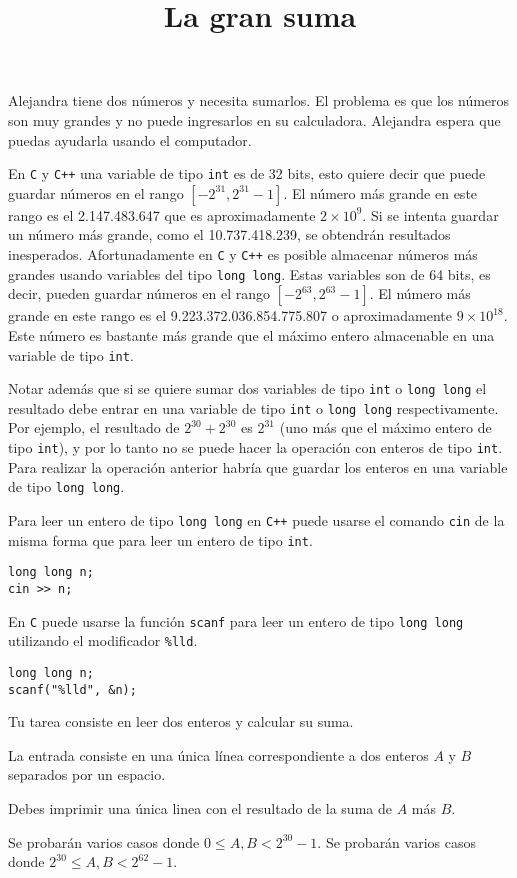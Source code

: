 \documentclass{oci}
\title{La gran suma}
\newcommand{\C}{\texttt{C}\xspace}
\newcommand{\Cpp}{\texttt{C++}\xspace}
\newcommand{\Int}{\texttt{int}\xspace}
\newcommand{\Long}{\texttt{long long}\xspace}
\newcommand{\cin}{\texttt{cin}\xspace}
\newcommand{\scanf}{\texttt{scanf}\xspace}
\begin{document}
\begin{problemDescription}
  Alejandra tiene dos números y necesita sumarlos.
El problema es que los números son muy grandes y no puede ingresarlos en su calculadora.
Alejandra espera que puedas ayudarla usando el computador.

En \C y \Cpp una variable de tipo \Int es de 32 bits, esto quiere decir que puede guardar números en el rango $[-2^{31}, 2^{31}-1]$.
El número más grande en este rango es el 2.147.483.647 que es aproximadamente $2\times 10^9$.
Si se intenta guardar un número más grande, como el 10.737.418.239, se obtendrán resultados inesperados.
Afortunadamente en \C y \Cpp es posible almacenar números más grandes usando variables del tipo \Long.
Estas variables son de 64 bits, es decir, pueden guardar números en el rango $[-2^{63}, 2^{63}-1]$.
El número más grande en este rango es el 9.223.372.036.854.775.807 o aproximadamente $9\times 10^{18}$.
Este número es bastante más grande que el máximo entero almacenable en una variable de tipo \Int.

Notar además que si se quiere sumar dos variables de tipo \Int o \Long el resultado debe entrar en una variable de tipo \Int o \Long respectivamente.
Por ejemplo, el resultado de $2^{30}+2^{30}$ es $2^{31}$ (uno más que el máximo entero de tipo \Int), y por lo tanto no se puede hacer la operación con enteros de tipo \Int.
Para realizar la operación anterior habría que guardar los enteros en una variable de tipo \Long.

Para leer un entero de tipo \Long en \Cpp puede usarse el comando \cin de la misma forma que para leer un entero de tipo \Int.
\begin{verbatim}
long long n;
cin >> n;
\end{verbatim}

En \C puede usarse la función \scanf para leer un entero de tipo \Long utilizando el modificador \texttt{\%lld}.
\begin{verbatim}
long long n;
scanf("%lld", &n);
\end{verbatim}

Tu tarea consiste en leer dos enteros y calcular su suma.
  
\end{problemDescription}

\begin{inputDescription}
  La entrada consiste en una única línea correspondiente a dos enteros $A$ y $B$ separados por un espacio.
\end{inputDescription}

\begin{outputDescription}
  Debes imprimir una única linea con el resultado de la suma de $A$ más $B$.
\end{outputDescription}

\begin{scoreDescription}
   Se probarán varios casos donde $0\leq A,B < 2^{30}-1$.
   Se probarán varios casos donde $2^{30}\leq A,B < 2^{62}-1$.
\end{scoreDescription}

\begin{sampleDescription}
\end{sampleDescription}
\end{document}
